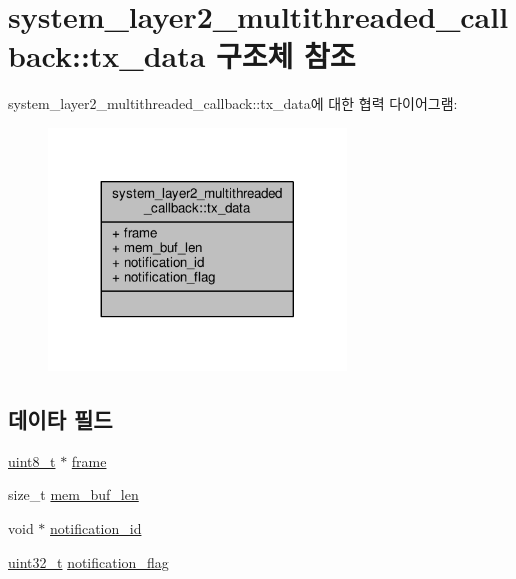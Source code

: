 \hypertarget{structavdecc__lib_1_1system__layer2__multithreaded__callback_1_1tx__data}{}\section{system\+\_\+layer2\+\_\+multithreaded\+\_\+callback\+:\+:tx\+\_\+data 구조체 참조}
\label{structavdecc__lib_1_1system__layer2__multithreaded__callback_1_1tx__data}


system\+\_\+layer2\+\_\+multithreaded\+\_\+callback\+:\+:tx\+\_\+data에 대한 협력 다이어그램\+:
\nopagebreak
\begin{figure}[H]
\begin{center}
\leavevmode
\includegraphics[width=224pt]{structavdecc__lib_1_1system__layer2__multithreaded__callback_1_1tx__data__coll__graph}
\end{center}
\end{figure}
\subsection*{데이타 필드}
\begin{DoxyCompactItemize}
\item 
\hyperlink{stdint_8h_aba7bc1797add20fe3efdf37ced1182c5}{uint8\+\_\+t} $\ast$ \hyperlink{structavdecc__lib_1_1system__layer2__multithreaded__callback_1_1tx__data_a891d4a7e60f4f6edbeb99d8ee5616935}{frame}
\item 
size\+\_\+t \hyperlink{structavdecc__lib_1_1system__layer2__multithreaded__callback_1_1tx__data_a37692c9e19e37f77671299e5b58c17ec}{mem\+\_\+buf\+\_\+len}
\item 
void $\ast$ \hyperlink{structavdecc__lib_1_1system__layer2__multithreaded__callback_1_1tx__data_a3b9916d5ab0c98a3d83a5cb17fff999d}{notification\+\_\+id}
\item 
\hyperlink{parse_8c_a6eb1e68cc391dd753bc8ce896dbb8315}{uint32\+\_\+t} \hyperlink{structavdecc__lib_1_1system__layer2__multithreaded__callback_1_1tx__data_a01e6e66d891af833ee1998e9309623cd}{notification\+\_\+flag}
\end{DoxyCompactItemize}


